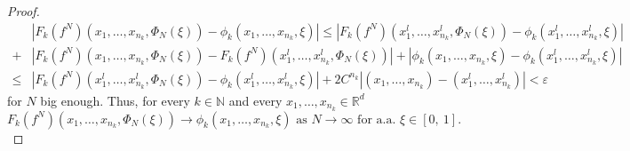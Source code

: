 \documentclass[10pt]{article}
\newcommand{\m}[1]{\mbox{#1}}
\newcommand*{\abs}[1]{\left\vert{#1}\right\vert}
\newcommand{\ve}{\varepsilon}
\begin{document}
\begin{proof}
\begin{align*}
&\abs{F_k(f^N)(x_1,\ldots,x_{n_k},\Phi_N(\xi))-\phi_k(x_1,\ldots,x_{n_k},\xi)} \leq \abs{F_k(f^N)(x^l_1,\ldots,x^l_{n_k},\Phi_N(\xi))-\phi_k(x^l_1,\ldots,x^l_{n_k},\xi)}\\
 +&\abs{F_k(f^N)(x_1,\ldots,x_{n_k},\Phi_N(\xi))-F_k(f^N)(x^l_1,\ldots,x^l_{n_k},\Phi_N(\xi))} + \abs{\phi_k(x_1,\ldots,x_{n_k},\xi) - \phi_k(x^l_1,\ldots,x^l_{n_k},\xi)}\\
\leq & \abs{F_k(f^N)(x^l_1,\ldots,x^l_{n_k},\Phi_N(\xi))-\phi_k(x^l_1,\ldots,x^l_{n_k},\xi)} + 2C^{n_k} \abs{(x_1,\dots,x_{n_k}) - (x_1^l,\dots,x_{n_k}^l)} < \ve
\end{align*}
for $N$ big enough. Thus, for every $k\in \mathbb{N}$ and every $x_1,\ldots,x_{n_k}\in \mathbb{R}^d$
\[F_k(f^N)(x_1,\ldots,x_{n_k},\Phi_N(\xi))\rightarrow \phi_k(x_1,\ldots,x_{n_k},\xi) \m{ as } N\rightarrow \infty \m{ for a.a. } \xi\in [0,\ 1].\]


\end{proof}
\end{document}
